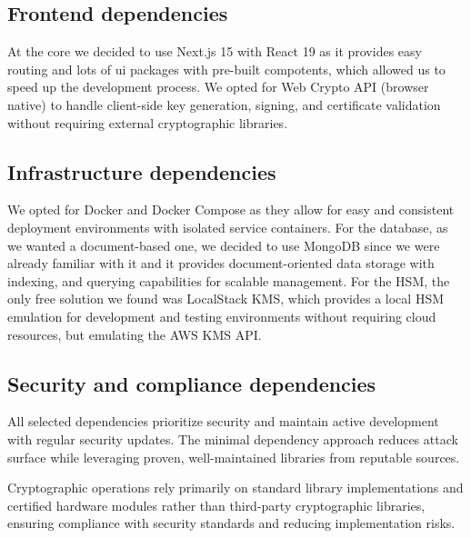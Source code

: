 \subsection{Frontend dependencies}

At the core we decided to use Next.js 15 with React 19 as it provides easy routing and
lots of ui packages with pre-built compotents, which allowed us to speed up the development process.
We opted for Web Crypto API (browser native) to handle 
client-side key generation, signing, and certificate validation without requiring 
external cryptographic libraries.

\subsection{Infrastructure dependencies}

We opted for Docker and Docker Compose as they allow for easy and consistent deployment 
environments with isolated service containers. For the database, as we wanted a document-based one,
we decided to use MongoDB since we were already familiar with it and it provides document-oriented 
data storage with indexing, and querying capabilities for scalable management.
For the HSM, the only free solution we found was LocalStack KMS, which provides a local HSM emulation
for development and testing environments without requiring cloud resources, but emulating the AWS KMS API.

\subsection{Security and compliance dependencies}

All selected dependencies prioritize security and maintain active development 
with regular security updates. The minimal dependency approach reduces attack 
surface while leveraging proven, well-maintained libraries from reputable sources. 

Cryptographic operations rely primarily on standard library implementations 
and certified hardware modules rather than third-party cryptographic libraries, 
ensuring compliance with security standards and reducing implementation risks.